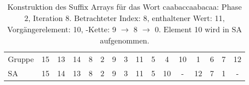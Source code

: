 \begin{table}[H]
\begin{adjustbox}{max width=\textwidth}
\begin{tabular}{lccccccccccccccc}
\multicolumn{1}{l|}{Gruppe}  & \multicolumn{1}{c|}{15} & 13 & \multicolumn{1}{c|}{14} & \multicolumn{1}{c|}{8}     & \multicolumn{1}{c|}{2}      & \multicolumn{1}{c|}{9}    & \multicolumn{1}{c|}{3}     & \multicolumn{1}{c|}{11}                         & \multicolumn{1}{c|}{5}   & 4                          & \multicolumn{1}{c|}{10} & 1   & 6   & 7   & 12  \\
\multicolumn{1}{l|}{SA}      & \multicolumn{1}{c|}{15} & 14 & \multicolumn{1}{c|}{13} & \multicolumn{1}{c|}{8}     & \multicolumn{1}{c|}{2}      & \multicolumn{1}{c|}{9}    & \multicolumn{1}{c|}{3}     & \multicolumn{1}{c|}{\cellcolor[HTML]{\green}11} & \multicolumn{1}{c|}{5}   & \cellcolor[HTML]{\red}10 & \multicolumn{1}{c|}{-}  & 12  & 7   & 1   & -  
\end{tabular}
\end{adjustbox}

\caption[Konstruktion des Suffix Arrays für das Wort caabaccaabacaa: Phase 2, Iteration 8]{Konstruktion des Suffix Arrays für das Wort caabaccaabacaa: Phase 2, Iteration 8. Betrachteter Index: 8, enthaltener Wert: 11, Vorgängerelement: 10, \prevpointer-Kette: 9 $\rightarrow$ 8 $\rightarrow$ 0. Element 10 wird in SA aufgenommen.}
\label{table_complex_example_2_8} 
\end{table}

